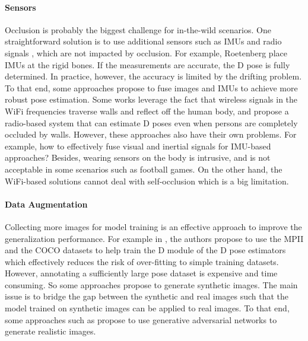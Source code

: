 \paragraph{Sensors} Occlusion is probably the biggest challenge for in-the-wild scenarios. One straightforward solution is to use additional sensors such as IMUs \citep{trumble2017total} and radio signals \citep{zhao2019through}, which are not impacted by occlusion. For example, Roetenberg \etal \citep{roetenberg2009xsens} place  IMUs at the rigid bones. If the measurements are accurate, the D pose is fully determined. In practice, however, the accuracy is limited by the drifting problem. To that end, some approaches \citep{trumble2017total,von2018recovering,gilbert2019fusing,malleson2017real,zhe2020fusingimu} propose to fuse images and IMUs to achieve more robust pose estimation. Some works \citep{zhao2019through,li2019making,zhao2018through} leverage the fact that wireless signals in the WiFi frequencies traverse walls and reflect off the human body, and propose a radio-based system that can estimate D poses even when persons are completely occluded by walls. However, these approaches also have their own problems. For example, how to effectively fuse visual and inertial signals for IMU-based approaches? Besides, wearing sensors on the body is intrusive, and is not acceptable in some scenarios such as football games. On the other hand, the WiFi-based solutions cannot deal with self-occlusion which is a big limitation.



\paragraph{Data Augmentation} Collecting more images for model training is an effective approach to improve the generalization performance. For example in \citep{zhou2017towards,qiu2019cross}, the authors propose to use the MPII \citep{andriluka14cvpr} and the COCO \citep{lin2014microsoft} datasets to help train the D module of the D pose estimators which effectively reduces the risk of over-fitting to simple training datasets. However, annotating a sufficiently large pose dataset is expensive and time consuming. So some approaches \citep{rogez2016mocap,varol2017learning,hoffmann2019learning,chen2016synthesizing,lassner2017unite} propose to generate synthetic images. The main issue is to bridge the gap between the synthetic and real images such that the model trained on synthetic images can be applied to real images. To that end, some approaches such as \citep{peng2018jointly} propose to use generative adversarial networks to generate realistic images.


